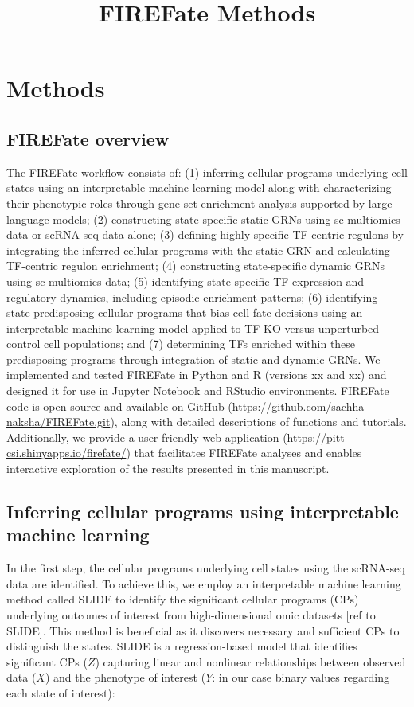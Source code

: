 \documentclass[11pt]{article}
\title{FIREFate Methods}
\date{}
\begin{document}
\section*{Methods}

\subsection*{FIREFate overview}

The FIREFate workflow consists of: (1) inferring cellular programs underlying cell
states using an interpretable machine learning model along with characterizing their
phenotypic roles through gene set enrichment analysis supported by large language
models; (2) constructing state-specific static GRNs using sc-multiomics data or
scRNA-seq data alone; (3) defining highly specific TF-centric regulons by integrating
the inferred cellular programs with the static GRN and calculating TF-centric regulon
enrichment; (4) constructing state-specific dynamic GRNs using sc-multiomics data;
(5) identifying state-specific TF expression and regulatory dynamics, including
episodic enrichment patterns; (6) identifying state-predisposing cellular programs
that bias cell-fate decisions using an interpretable machine learning model applied to
TF-KO versus unperturbed control cell populations; and (7) determining TFs enriched
within these predisposing programs through integration of static and dynamic GRNs.
We implemented and tested FIREFate in Python and R (versions xx and xx) and designed
it for use in Jupyter Notebook and RStudio environments. FIREFate code is open source
and available on GitHub (\url{https://github.com/sachha-naksha/FIREFate.git}), along
with detailed descriptions of functions and tutorials. Additionally, we provide a
user-friendly web application (\url{https://pitt-csi.shinyapps.io/firefate/}) that
facilitates FIREFate analyses and enables interactive exploration of the results
presented in this manuscript.

\subsection*{Inferring cellular programs using interpretable machine learning}

In the first step, the cellular programs underlying cell states using the scRNA-seq
data are identified. To achieve this, we employ an interpretable machine learning
method called SLIDE to identify the significant cellular programs (CPs) underlying
outcomes of interest from high-dimensional omic datasets [ref to SLIDE]. This method
is beneficial as it discovers necessary and sufficient CPs to distinguish the states.
SLIDE is a regression-based model that identifies significant CPs ($Z$) capturing
linear and nonlinear relationships between observed data ($X$) and the phenotype of
interest ($Y$: in our case binary values regarding each state of interest):
\end{document}
